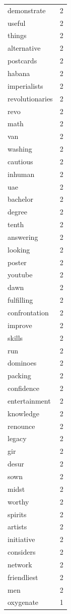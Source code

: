 \begin{tabular}{lr}
demonstrate & 2 \\
useful & 2 \\
things & 2 \\
alternative & 2 \\
postcards & 2 \\
habana & 2 \\
imperialists & 2 \\
revolutionaries & 2 \\
revo & 2 \\
math & 2 \\
van & 2 \\
washing & 2 \\
cautious & 2 \\
inhuman & 2 \\
uae & 2 \\
bachelor & 2 \\
degree & 2 \\
tenth & 2 \\
answering & 2 \\
looking & 2 \\
poster & 2 \\
youtube & 2 \\
dawn & 2 \\
fulfilling & 2 \\
confrontation & 2 \\
improve & 2 \\
skills & 2 \\
run & 2 \\
dominoes & 2 \\
packing & 2 \\
confidence & 2 \\
entertainment & 2 \\
knowledge & 2 \\
renounce & 2 \\
legacy & 2 \\
gir & 2 \\
desur & 2 \\
sown & 2 \\
midst & 2 \\
worthy & 2 \\
spirits & 2 \\
artists & 2 \\
initiative & 2 \\
considers & 2 \\
network & 2 \\
friendliest & 2 \\
men & 2 \\
oxygenate & 1 \\

\end{tabular}
